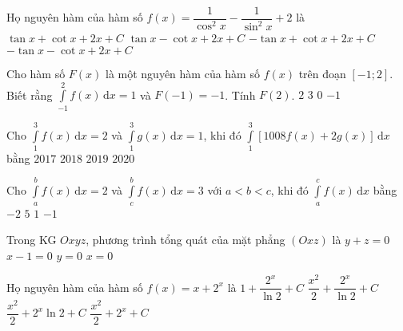 \begin{ex}%
Họ nguyên hàm của hàm số $f(x)=\dfrac{1}{\cos^2 x}-\dfrac{1}{\sin^2 x}+2$ là
\choice
{\True $\tan x+\cot x+2x+C$}
{$\tan x-\cot x+2x+C$}
{$-\tan x+\cot x+2x+C$}
{$-\tan x-\cot x+2x+C$}
\end{ex}

\begin{ex}%
Cho hàm số $F(x)$ là một nguyên hàm của hàm số $f(x)$ trên đoạn $[-1; 2]$. Biết rằng $\displaystyle\int\limits_{-1}^2 f(x)\mathrm{\,d}x=1$ và $F(-1)=-1$. Tính $F(2)$.
\choice
{$2$}
{$3$}
{\True $0$}
{$-1$}
\end{ex}

\begin{ex}%
Cho $ \displaystyle \int\limits_1^3 f(x) \mathrm{\,d}x=2 $ và $ \displaystyle \int\limits_1^3 g(x) \mathrm{\,d}x=1 $, khi đó $ \displaystyle \int\limits_1^3 \left[1008 f(x)+2g(x)\right] \mathrm{\,d}x $ bằng
\choice
{$ 2017 $}
{\True $ 2018 $}
{$ 2019 $}
{$ 2020 $}
\end{ex}

\begin{ex}%
Cho $\displaystyle\int\limits_a^b f(x)\mathrm{\,d}x=2$ và $\displaystyle\int\limits_c^b f(x)\mathrm{\,d}x=3$ với $a<b<c$, khi đó $\displaystyle\int\limits_a^c f(x)\mathrm{\,d}x$ bằng
\choice
{$-2$}
{$5$}
{$1$}
{\True $-1$}
\end{ex}

\begin{ex}%
Trong KG $Oxyz$, phương trình tổng quát của mặt phẳng $(Oxz)$ là
\choice
{$y+z=0$}
{$x-1=0$}
{\True $y=0$}
{$x=0$}
\end{ex}

\begin{ex}%
Họ nguyên hàm của hàm số $f(x)=x+2^x$ là
\choice
{$1+\dfrac{2^x}{\ln 2}+C$}
{\True $\dfrac{x^2}{2}+\dfrac{2^x}{\ln 2}+C$}
{$\dfrac{x^2}{2}+2^x \ln 2+C$}
{$\dfrac{x^2}{2}+2^x+C$}
\end{ex}

